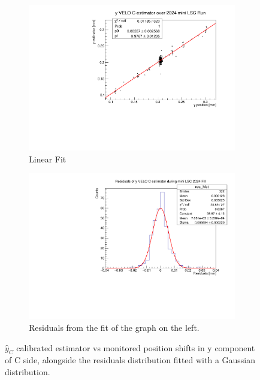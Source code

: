 \begin{figure}
    \centering
    \begin{subfigure}{0.48\textwidth}
    \includegraphics[width=\linewidth]{figures/yVeloC_fit_comparison.pdf}
    \caption{Linear Fit}\label{fig:yCfit_comparison}
    \end{subfigure}
    \begin{subfigure}{0.48\textwidth}
    \includegraphics[width=\linewidth]{figures/yVeloC_res_comparison.pdf}
    \caption{Residuals from the fit of the graph on the left. }\label{fig:yCres_comparison}
    \end{subfigure}
    \caption{$\hat{y}_{C}$ calibrated estimator vs monitored position shifts in y component of C side, alongside the residuals distribution fitted with a Gaussian distribution.}
    \label{fig:yC_comparison}
\end{figure}


